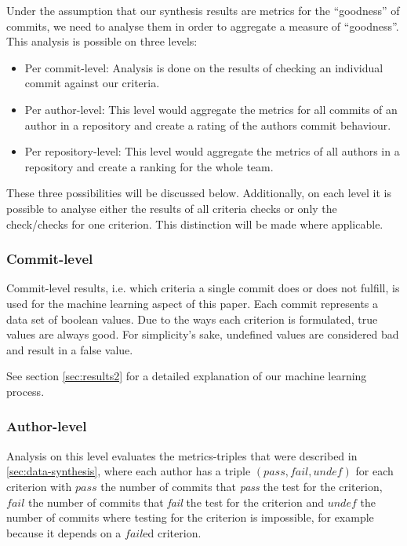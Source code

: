 Under the assumption that our synthesis results are metrics for the ``goodness'' of commits, we need to analyse them in order to aggregate a measure of ``goodness''. This analysis is possible on three levels:

\begin{itemize}
  \item Per commit-level: Analysis is done on the results of checking an individual commit against our criteria.
  \item Per author-level: This level would aggregate the metrics for all commits of an author in a repository and create a rating of the authors commit behaviour.
  \item Per repository-level: This level would aggregate the metrics of all authors in a repository and create a ranking for the whole team.
\end{itemize}

These three possibilities will be discussed below. Additionally, on each level it is possible to analyse either the results of all criteria checks or only the check/checks for one criterion. This distinction will be made where applicable.

\subsubsection{Commit-level}
\label{subs:Commit-level}
Commit-level results, i.e. which criteria a single commit does or does not fulfill, is used for the machine learning aspect of this paper. Each commit represents a data set of boolean values. Due to the ways each criterion is formulated, true values are always good. For simplicity's sake, undefined values are considered bad and result in a false value.

See section \ref{sec:results2} for a detailed explanation of our machine learning process.

\subsubsection{Author-level}
\label{subs:Author-level}
Analysis on this level evaluates the metrics-triples that were described in \ref{sec:data-synthesis}, where each author has a triple $(pass, fail, undef)$ for each criterion with $pass$ the number of commits that \emph{pass} the test for the criterion, $fail$ the number of commits that \emph{fail} the test for the criterion and $undef$ the number of commits where testing for the criterion is impossible, for example because it depends on a $fail$ed criterion.

